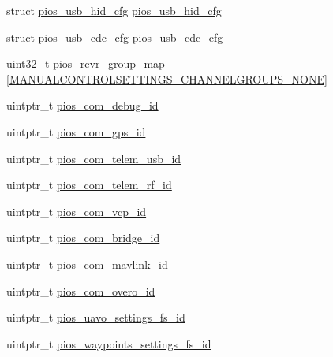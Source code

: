 \begin{DoxyCompactItemize}
\item 
struct \hyperlink{structpios__usb__hid__cfg}{pios\-\_\-usb\-\_\-hid\-\_\-cfg} \hyperlink{group___flying_f4_ga3665f6d3a2cccc431b55b9432291e94c}{pios\-\_\-usb\-\_\-hid\-\_\-cfg}
\item 
struct \hyperlink{structpios__usb__cdc__cfg}{pios\-\_\-usb\-\_\-cdc\-\_\-cfg} \hyperlink{group___flying_f4_ga05cc3e449d417c7f9097d2659e6f5ca3}{pios\-\_\-usb\-\_\-cdc\-\_\-cfg}
\item 
uint32\-\_\-t \hyperlink{group___flying_f4_ga6c6cfc16eb738e47c123298e062297e2}{pios\-\_\-rcvr\-\_\-group\-\_\-map} \mbox{[}\hyperlink{group___manual_control_settings_gga94e1fe696fef2f85cbdb4a2e479c7ed2af9104b4e2c50328b0912db1e10fc3074}{\-M\-A\-N\-U\-A\-L\-C\-O\-N\-T\-R\-O\-L\-S\-E\-T\-T\-I\-N\-G\-S\-\_\-\-C\-H\-A\-N\-N\-E\-L\-G\-R\-O\-U\-P\-S\-\_\-\-N\-O\-N\-E}\mbox{]}
\item 
uintptr\-\_\-t \hyperlink{group___flying_f4_ga14dc9e3d330b80a37a9699c2112358e0}{pios\-\_\-com\-\_\-debug\-\_\-id}
\item 
uintptr\-\_\-t \hyperlink{group___flying_f4_ga05dca72c42c6c2b33fa62b8ee0fcb2ea}{pios\-\_\-com\-\_\-gps\-\_\-id}
\item 
uintptr\-\_\-t \hyperlink{group___flying_f4_ga513cc36d72b76de2fcb75ff233a79a4a}{pios\-\_\-com\-\_\-telem\-\_\-usb\-\_\-id}
\item 
uintptr\-\_\-t \hyperlink{group___flying_f4_gae48e848f715b08971e23528feee79339}{pios\-\_\-com\-\_\-telem\-\_\-rf\-\_\-id}
\item 
uintptr\-\_\-t \hyperlink{group___flying_f4_gaaeb3e0d65ed5c6e7b921c54e1ad905db}{pios\-\_\-com\-\_\-vcp\-\_\-id}
\item 
uintptr\-\_\-t \hyperlink{group___flying_f4_gac040f05fa048688ee0269c2768698a14}{pios\-\_\-com\-\_\-bridge\-\_\-id}
\item 
uintptr\-\_\-t \hyperlink{group___flying_f4_gabdefeb92517c08b2db19b764db941de9}{pios\-\_\-com\-\_\-mavlink\-\_\-id}
\item 
uintptr\-\_\-t \hyperlink{group___flying_f4_ga048f2bb98de60944f135effb407a1139}{pios\-\_\-com\-\_\-overo\-\_\-id}
\item 
uintptr\-\_\-t \hyperlink{group___flying_f4_gab060f441dd600b08386c0ca1b487217a}{pios\-\_\-uavo\-\_\-settings\-\_\-fs\-\_\-id}
\item 
uintptr\-\_\-t \hyperlink{group___flying_f4_ga4b04979e5fb31eaa66088178605835cd}{pios\-\_\-waypoints\-\_\-settings\-\_\-fs\-\_\-id}
\end{DoxyCompactItemize}


